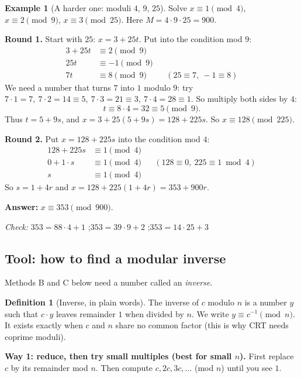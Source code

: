 \documentclass[11pt]{article}
\theoremstyle{definition}
\newtheorem{definition}[theorem]{Definition}
\newtheorem{example}[theorem]{Example}
\theoremstyle{remark}
\begin{document}
\begin{example}[A harder one: moduli $4$, $9$, $25$]\label{ex:qs-hard}
Solve $x\equiv 1\pmod 4$, $x\equiv 2\pmod 9$, $x\equiv 3\pmod{25}$. Here $M=4\cdot9\cdot25=900$.

\textbf{Round 1.} Start with $25$: $x=3+25t$. Put into the condition mod $9$:
\begin{align*}
3+25t &\equiv 2 \pmod 9\\
25t &\equiv -1 \pmod 9\\
7t &\equiv 8 \pmod 9 &&(25\equiv 7,\ -1\equiv 8)
\end{align*}
We need a number that turns $7$ into $1$ modulo $9$: try $7\cdot1=7,\ 7\cdot2=14\equiv5,\ 7\cdot3=21\equiv3,\ 7\cdot4=28\equiv1$. So multiply both sides by $4$:
\[
t\equiv 8\cdot 4=32\equiv 5\pmod 9.
\]
Thus $t=5+9s$, and $x=3+25(5+9s)=128+225s$. So $x\equiv128\pmod{225}$.

\textbf{Round 2.} Put $x=128+225s$ into the condition mod $4$:
\begin{align*}
128+225s &\equiv 1 \pmod 4\\
0+1\cdot s &\equiv 1 \pmod 4 &&(128\equiv0,\ 225\equiv1 \bmod 4)\\
s &\equiv 1 \pmod 4
\end{align*}
So $s=1+4r$ and $x=128+225(1+4r)=353+900r$.

\textbf{Answer:} $x\equiv 353\pmod{900}$.

\emph{Check:} $353=88\cdot4+1$ \checkmark;\quad $353=39\cdot9+2$ \checkmark;\quad $353=14\cdot25+3$ \checkmark
\end{example}

\subsection{Tool: how to find a modular inverse}\label{sec:qs-inverse}

Methods B and C below need a number called an \emph{inverse}. 

\begin{definition}[Inverse, in plain words]
The inverse of $c$ modulo $n$ is a number $y$ such that $c\cdot y$ leaves remainder $1$ when divided by $n$. We write $y\equiv c^{-1}\pmod n$. It exists exactly when $c$ and $n$ share no common factor (this is why CRT needs coprime moduli).
\end{definition}

\textbf{Way 1: reduce, then try small multiples (best for small $n$).}
First replace $c$ by its remainder mod $n$. Then compute $c,2c,3c,\dots$ (mod $n$) until you see $1$.
\end{document}
